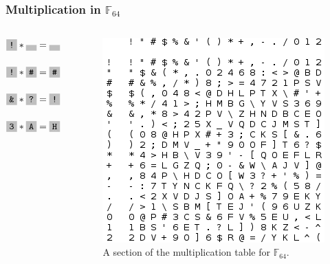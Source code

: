 \documentclass{beamer}
\begin{document}
\begin{frame}
	\frametitle{Multiplication in $\mathbb{F}_{64}$}

	\begin{columns}[T]
	
	\begin{column}{.5\textwidth}
	\begin{block}{}
		$\f{!} * \f{ } = \f{ }$ \\~\\
		$\f{!} * \f{\#} = \f{\#}$\\~\\
		$\f{\&} * \f{?} = \f{!}$\\~\\
        $\f{3} * \f{A} = \f{H}$\\~\\
	\end{block}
	\end{column}
	
	\begin{column}{.5\textwidth}
	\begin{block}{}
		\begin{figure}
	\includegraphics[height=0.5\textheight]{MultTableSection.png}
	\caption{A section of the multiplication table for $\mathbb{F}_{64}$.}
	\label{fig:Mult}
	\end{figure}
	\end{block}
	\end{column}
	
	\end{columns}
\end{frame}
\end{document}
